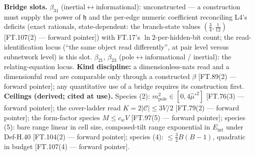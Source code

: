 \begin{definition}
\textbf{Bridge slots.} $\beta_{31}$ (inertial$\leftrightarrow$informational): unconstructed — a construction must supply the power of $\mathfrak h$ and the per-edge numeric coefficient reconciling L4's deficits (exact rationals, state-dependent: the branch-state values $(\tfrac34,\tfrac1{12})$ [FT.107(2) — forward pointer]) with FT.17's $\ln2$-per-hidden-bit count; the read-identification locus (“the same object read differently”, at pair level versus subnetwork level) is this slot. $\beta_{21}$, $\beta_{23}$ (pole$\leftrightarrow$informational / inertial): the relating-equation locus. \textbf{Kind discipline:} a dimensionless-nats read and a dimensionful read are comparable only through a constructed $\beta$ [FT.89(2) — forward pointer]; any quantitative use of a bridge requires its construction first. \textbf{Ceilings (derived; cited at use).} Species (2): $m^2_{\mathrm{pole}}\in[0,4\hat\mu'^2]$ [FT.76(3) — forward pointer]; the cover-ladder read $K=2|\mathcal C|\le3V/2$ [FT.79(2) — forward pointer]; the form-factor species $M\le c_wV$ [FT.97(5) — forward pointer]; species (5): bare range linear in cell size, composed-tilt range exponential in $E_{\mathrm{int}}$ under Def-H.40 [FT.104(2) — forward pointer]; species (4): $\le\tfrac32B(B-1)$, quadratic in budget [FT.107(4) — forward pointer].

\end{definition}

